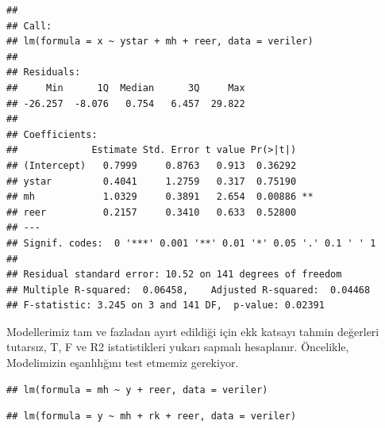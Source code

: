 \documentclass[]{article}
\newenvironment{Shaded}{\begin{snugshade}}{\end{snugshade}}
\newcommand{\KeywordTok}[1]{\textcolor[rgb]{0.13,0.29,0.53}{\textbf{#1}}}
\newcommand{\StringTok}[1]{\textcolor[rgb]{0.31,0.60,0.02}{#1}}
\newcommand{\OperatorTok}[1]{\textcolor[rgb]{0.81,0.36,0.00}{\textbf{#1}}}
\newcommand{\NormalTok}[1]{#1}
\begin{document}
\begin{verbatim}
## 
## Call:
## lm(formula = x ~ ystar + mh + reer, data = veriler)
## 
## Residuals:
##     Min      1Q  Median      3Q     Max 
## -26.257  -8.076   0.754   6.457  29.822 
## 
## Coefficients:
##             Estimate Std. Error t value Pr(>|t|)   
## (Intercept)   0.7999     0.8763   0.913  0.36292   
## ystar         0.4041     1.2759   0.317  0.75190   
## mh            1.0329     0.3891   2.654  0.00886 **
## reer          0.2157     0.3410   0.633  0.52800   
## ---
## Signif. codes:  0 '***' 0.001 '**' 0.01 '*' 0.05 '.' 0.1 ' ' 1
## 
## Residual standard error: 10.52 on 141 degrees of freedom
## Multiple R-squared:  0.06458,    Adjusted R-squared:  0.04468 
## F-statistic: 3.245 on 3 and 141 DF,  p-value: 0.02391
\end{verbatim}

Modellerimiz tam ve fazladan ayırt edildiği için ekk katsayı tahmin
değerleri tutarsız, T, F ve R2 istatistikleri yukarı sapmalı hesaplanır.
Öncelikle, Modelimizin eşanlılığını test etmemiz gerekiyor.

\begin{Shaded}
\end{Shaded}

\begin{verbatim}
## lm(formula = mh ~ y + reer, data = veriler)
\end{verbatim}

\begin{Shaded}
\end{Shaded}

\begin{verbatim}
## lm(formula = y ~ mh + rk + reer, data = veriler)
\end{verbatim}

\begin{Shaded}
\end{Shaded}
\end{document}
